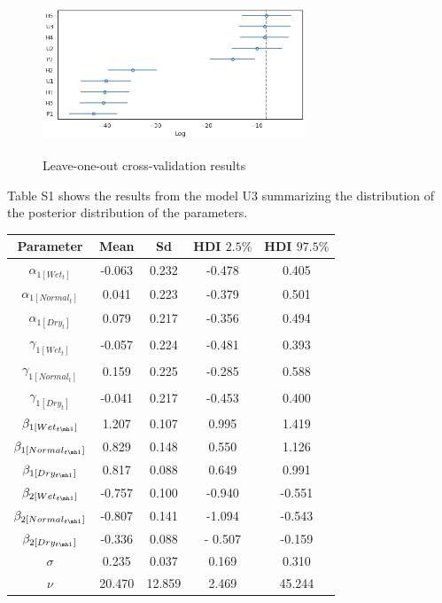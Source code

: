 \documentclass[11pt,a4paper]{article}
\begin{document}
\begin{figure}[H]
\centering
\includegraphics[width=0.7\textwidth]{model_comparison_calibration.png}
\label{fig:mesh1}
\caption{Leave-one-out cross-validation results}
\end{figure}

Table S1 shows the results from the model U3 summarizing the distribution of the posterior distribution of the parameters.

\begin{center}
\begin{tabular}{ |c|c|c|c|c| }
 \hline
 Parameter & Mean & Sd & HDI $2.5\%$ & HDI $97.5\%$ \\ 
 \hline
$\alpha_{1[Wet_{t}]}$ & 	-0.063 &	0.232 &	-0.478 &	0.405 		 \\
$\alpha_{1[Normal_{t}]}$ & 0.041 &	0.223 &	-0.379 &	0.501 	 \\
$\alpha_{1[Dry_{t}]}$ & 	 0.079 &	0.217 &	-0.356 &	0.494	 \\
$\gamma_{1[Wet_{t}]}$ & 	-0.057 	& 0.224 &	-0.481 &	0.393 	 \\
$\gamma_{1[Normal_{t}]}$ & 0.159 &	0.225 &	-0.285 &	0.588 \\
$\gamma_{1[Dry_{t}]}$ & -0.041 &	0.217 &	-0.453 &	0.400 	 \\
$\beta_{1[Wet_{t \mh 1}]}$ & 1.207 &	0.107 &	0.995 &	1.419 	 \\
$\beta_{1[Normal_{t \mh 1}]}$ 	& 0.829 &	0.148 &	0.550 &	1.126	\\
$\beta_{1[Dry_{t \mh 1}]}$ & 0.817 &	0.088 &	0.649 &	0.991 \\
$\beta_{2[Wet_{t \mh 1}]}$ & -0.757 	& 0.100 & -0.940 & 	-0.551 	 \\
$\beta_{2[Normal_{t \mh 1}]}$ & -0.807 &	0.141 &	-1.094 & -0.543 	\\
$\beta_{2[Dry_{t \mh 1}]}$ & -0.336 	& 0.088 & 	- 0.507 &  -0.159 \\
$\sigma$ & 0.235 & 	0.037 & 0.169 & 	0.310 \\
$\nu$ 	& 20.470 & 	12.859 & 2.469 &  	45.244 \\
\hline
\end{tabular}
\end{center}
\end{document}
